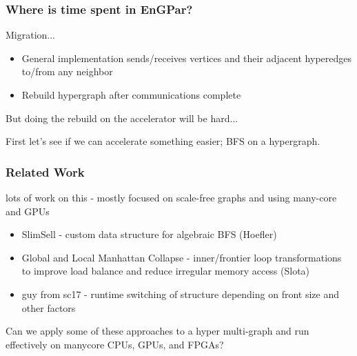 \documentclass{beamer}
\begin{document}
\begin{frame}
  \frametitle{Where is time spent in EnGPar?}
  Migration...
  \begin{itemize}
    \item General implementation sends/receives vertices and their adjacent
      hyperedges to/from any neighbor
    \item Rebuild hypergraph after communications complete
  \end{itemize}

  But doing the rebuild on the accelerator will be hard...
  
  First let's see if we can accelerate something easier; BFS on a
  hypergraph.
\end{frame}

\begin{frame}
  \frametitle{Related Work}
  lots of work on this - mostly focused on scale-free graphs and using many-core
  and GPUs
  \begin{itemize}
    \item SlimSell - custom data structure for algebraic BFS (Hoefler)
    \item Global and Local Manhattan Collapse - inner/frontier loop transformations to
      improve load balance and reduce irregular memory access (Slota)
    \item guy from sc17 - runtime switching of structure depending on front size
      and other factors
  \end{itemize}
  Can we apply some of these approaches to a hyper multi-graph and run
  effectively on manycore CPUs, GPUs, and FPGAs?
\end{frame}
\end{document}
